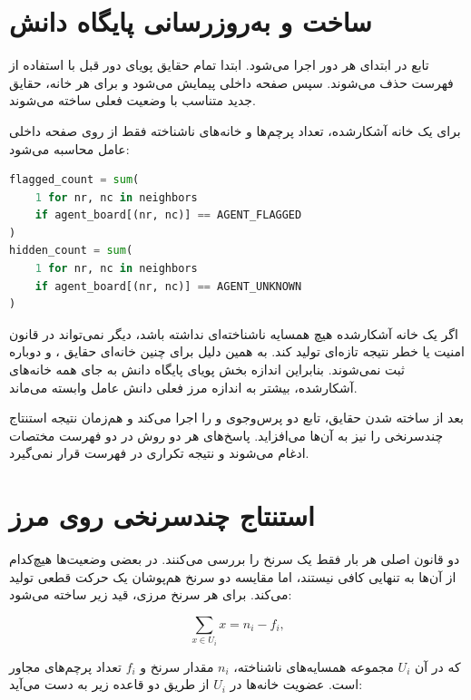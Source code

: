 \documentclass[10.5pt]{exam}
\begin{document}
\section{ساخت و به‌روزرسانی پایگاه دانش}
تابع
در ابتدای هر دور اجرا می‌شود. ابتدا تمام حقایق پویای دور قبل با استفاده از فهرست
حذف می‌شوند. سپس صفحه داخلی پیمایش می‌شود و برای هر خانه، حقایق جدید متناسب با وضعیت فعلی ساخته می‌شوند.

برای یک خانه آشکارشده، تعداد پرچم‌ها و خانه‌های ناشناخته فقط از روی صفحه داخلی عامل محاسبه می‌شود:

\begin{latin}
    \begin{lstlisting}[language=Python]
flagged_count = sum(
    1 for nr, nc in neighbors
    if agent_board[(nr, nc)] == AGENT_FLAGGED
)
hidden_count = sum(
    1 for nr, nc in neighbors
    if agent_board[(nr, nc)] == AGENT_UNKNOWN
)
\end{lstlisting}
\end{latin}

اگر یک خانه آشکارشده هیچ همسایه ناشناخته‌ای نداشته باشد، دیگر نمی‌تواند در قانون امنیت یا خطر نتیجه تازه‌ای تولید کند. به همین دلیل برای چنین خانه‌ای حقایق
،
و
دوباره ثبت نمی‌شوند. بنابراین اندازه بخش پویای پایگاه دانش به جای همه خانه‌های آشکارشده، بیشتر به اندازه مرز فعلی دانش عامل وابسته می‌ماند.

بعد از ساخته شدن حقایق، تابع
دو پرس‌وجوی
و
را اجرا می‌کند و هم‌زمان نتیجه استنتاج چندسرنخی را نیز به آن‌ها می‌افزاید. پاسخ‌های هر دو روش در دو فهرست مختصات ادغام می‌شوند و نتیجه تکراری در فهرست قرار نمی‌گیرد.

\section{استنتاج چندسرنخی روی مرز}
دو قانون اصلی هر بار فقط یک سرنخ را بررسی می‌کنند. در بعضی وضعیت‌ها هیچ‌کدام از آن‌ها به تنهایی کافی نیستند، اما مقایسه دو سرنخ هم‌پوشان یک حرکت قطعی تولید می‌کند. برای هر سرنخ مرزی، قید زیر ساخته می‌شود:

\[
    \sum_{x\in U_i} x = n_i-f_i,
\]

که در آن $U_i$ مجموعه همسایه‌های ناشناخته، $n_i$ مقدار سرنخ و $f_i$ تعداد پرچم‌های مجاور است. عضویت خانه‌ها در $U_i$ از طریق دو قاعده
زیر به دست می‌آید:
\end{document}
